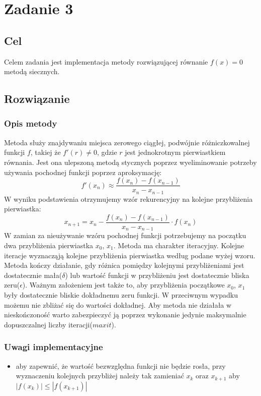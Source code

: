 \documentclass{article}
\begin{document}
\section{Zadanie 3}
\subsection{Cel}
Celem zadania jest implementacja metody rozwiązującej równanie $f(x) = 0$ metodą siecznych.

\subsection{Rozwiązanie}
\subsubsection{Opis metody}
Metoda służy znajdywaniu miejsca zerowego ciągłej, podwójnie różniczkowalnej funkcji $f$, takiej że $f'(r) \ne 0$,
gdzie $r$ jest jednokrotnym pierwiastkiem równania. Jest ona ulepszoną metodą stycznych poprzez wyeliminowanie 
potrzeby używania pochodnej funkcji poprzez aproksymację:
\[ f'(x_{n}) \approx \frac{f(x_{n}) - f(x_{n-1})}{x_{n}-x_{n-1}} \]
W wyniku podstawienia otrzymujemy wzór rekurencyjny na kolejne przybliżenia pierwiastka:
\[ x_{n+1} = x_n - \frac{f(x_{n}) - f(x_{n-1})}{x_{n}-x_{n-1}} \cdot f(x_n) \]
W zamian za nieużywanie wzóru pochodnej funkcji potrzebujemy na początku dwa przybliżenia pierwiastka $x_0$, $x_1$.
Metoda ma charakter iteracyjny. Kolejne iteracje wyznacząją kolejne przybliżenia pierwiastka według podane wyżej wzoru.
Metoda kończy działanie, gdy różnica pomiędzy kolejnymi przybliżeniami jest dostatecznie mała($\delta$) lub wartość funkcji w przybliżeniu jest dostatecznie bliska zeru($\epsilon$). 
Ważnym założeniem jest także to, aby przybliżenia początkowe $x_0$, $x_1$ były dostatecznie bliskie dokładnemu zeru funkcji. W przeciwnym wypadku możemu nie zbliżać się do wartości dokładnej.
Aby metoda nie działała w nieskończoność warto zabezpieczyć ją poprzez wykonanie jedynie maksymalnie dopuszczalnej liczby iteracji($maxit$).

\subsubsection{Uwagi implementacyjne}
\begin{itemize}
    \item aby zapewnić, że wartość bezwzględna funkcji nie będzie rosła, przy wyznaczeniu kolejnych przybliżej 
    należy tak zamieniać $x_k$ oraz $x_{k+1}$ aby $|f(x_k)| \leq |f(x_{k+1})|$
\end{itemize}
\end{document}
